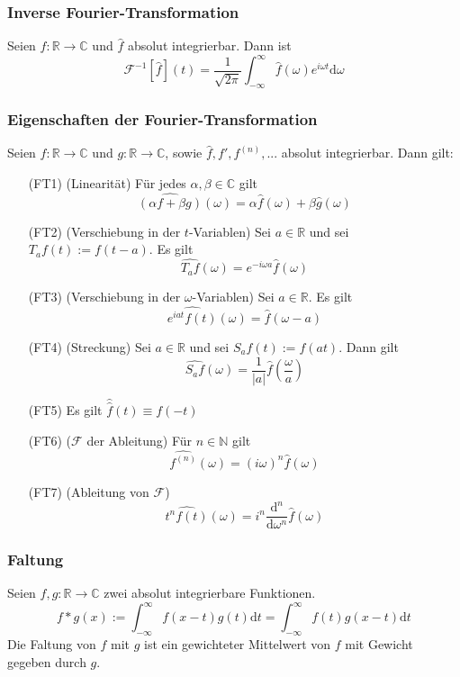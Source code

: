 \documentclass[8pt, a4paper, landscape, fleqn]{scrartcl}
\def\R{\mathbb{R}}
\def\N{\mathbb{N}}
\def\C{\mathbb{C}}
\def\d{\text{d}}
\def\F{\mathcal{F}}
\def\FI{\mathcal{F}^{-1}}
\begin{document}
\begin{multicols*}{3}
		\subsubsection{Inverse Fourier-Transformation}
		Seien $f:\R\to\C$ und $\hat f$ absolut integrierbar. Dann ist $$\FI[\hat f](t) = \frac{1}{\sqrt{2\pi}}\int_{-\infty}^\infty \hat f(\omega)e^{i\omega t}\d \omega $$
		
		\subsubsection{Eigenschaften der Fourier-Transformation}
		Seien $f:\R\to\C$ und $g:\R\to\C$, sowie $\hat f, f', f^{(n)}, ...$ absolut integrierbar. Dann gilt: 
		\begin{itemize}[leftmargin=1cm]
		    \item[(FT1)] (Linearität) Für jedes $\alpha, \beta \in \C$ gilt $$\widehat{(\alpha f + \beta g)} (\omega) = \alpha \hat f(\omega) + \beta \hat g (\omega)$$
		    \item[(FT2)] (Verschiebung in der $t$-Variablen) Sei $a\in\R$ und sei $T_a f(t) := f(t-a)$. Es gilt 
		    $$ \widehat{T_a f}(\omega) = e^{-i\omega a} \hat f(\omega) $$
		    \item[(FT3)] (Verschiebung in der $\omega$-Variablen) Sei $a\in\R$. Es gilt 
		    $$ \widehat{e^{iat}f(t)}(\omega) = \hat f (\omega-a) $$
		    \item[(FT4)] (Streckung) Sei $a\in\R$ und sei $S_a f(t) := f(at)$. Dann gilt 
		    $$ \widehat{S_a f}(\omega) = \frac{1}{|a|} \hat f \left(\frac{\omega}{a}\right) $$
		    \item[(FT5)] Es gilt $\hat{\hat{f}} (t) \equiv f(-t)$
		    \item[(FT6)] ($\F$ der Ableitung) Für $n\in\N$ gilt
		    $$ \widehat{f^{(n)}}(\omega) = (i\omega)^n \hat f(\omega)$$
		    \item[(FT7)] (Ableitung von $\F$) 
		    $$ \widehat{t^n f(t)}(\omega) = i^n \frac{\d^n}{\d \omega^n}\hat f (\omega) $$
		\end{itemize}
		
		\subsubsection{Faltung}
		Seien $f, g : \R\to\C$ zwei absolut integrierbare Funktionen. 
		$$ f*g(x) := \int_{-\infty}^\infty f(x-t)g(t)\d t = \int_{-\infty}^\infty f(t) g(x-t) \d t $$
		Die Faltung von $f$ mit $g$ ist ein gewichteter Mittelwert von $f$ mit Gewicht gegeben durch $g$. \\
		

\end{multicols*}
\end{document}
